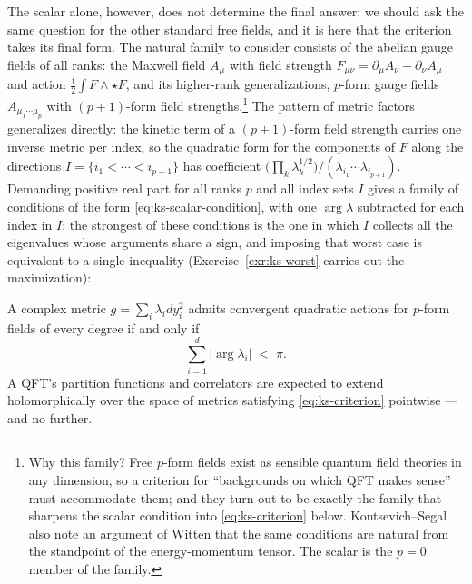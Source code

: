The scalar alone, however, does not determine the final answer; we should
ask the same question for the other standard free fields, and it is here
that the criterion takes its final form. The natural family to consider
consists of the abelian gauge fields of all ranks: the Maxwell field $A_\mu$
with field strength $F_{\mu\nu} = \partial_\mu A_\nu - \partial_\nu A_\mu$
and action $\frac12\int F \wedge \star F$, and its higher-rank
generalizations, $p$-form gauge fields $A_{\mu_1\cdots\mu_p}$ with
$(p+1)$-form field strengths.\footnote{Why this family? Free $p$-form fields
exist as sensible quantum field theories in any dimension, so a criterion
for ``backgrounds on which QFT makes sense'' must accommodate them; and they
turn out to be exactly the family that sharpens the scalar condition into
\eqref{eq:ks-criterion} below. Kontsevich--Segal also note an argument of
Witten that the same conditions are natural from the standpoint of the
energy-momentum tensor. The scalar is the $p = 0$ member of the family.}
The pattern of metric factors generalizes directly: the kinetic term of a
$(p+1)$-form field strength carries one inverse metric per index, so the
quadratic form for the components of $F$ along the directions $I = \{i_1 <
\cdots < i_{p+1}\}$ has coefficient $\big(\prod_k \lambda_k^{1/2}\big) /
(\lambda_{i_1} \cdots \lambda_{i_{p+1}})$. Demanding positive real part for
all ranks $p$ and all index sets $I$ gives a family of conditions of the
form \eqref{eq:ks-scalar-condition}, with one $\arg\lambda$ subtracted for
each index in $I$; the strongest of these conditions is the one in which $I$
collects all the eigenvalues whose arguments share a sign, and imposing that
worst case is equivalent to a single inequality
(Exercise~\ref{exr:ks-worst} carries out the maximization):

\begin{ttheorem}
\label{thm:ks}
A complex metric $g = \sum_i \lambda_i dy_i^2$ admits convergent quadratic
actions for $p$-form fields of every degree if and only if
\begin{equation}
\sum_{i=1}^{d} \big|\arg \lambda_i \big| \;<\; \pi .
\label{eq:ks-criterion}
\end{equation}
A QFT's partition functions and correlators are expected to extend
holomorphically over the space of metrics satisfying \eqref{eq:ks-criterion}
pointwise --- and no further.
\end{ttheorem}

